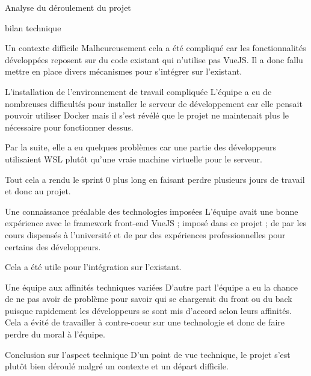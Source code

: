 \documentclass[]{article}
\begin{document}
{\begin{section}{Analyse du déroulement du projet}
\begin{subsection}{bilan technique}
\begin{subsubsection}{Un contexte difficile}
         Malheureusement cela a été compliqué car les fonctionnalités développées reposent sur du code existant qui n'utilise pas VueJS. Il a donc fallu mettre en place divers mécanismes pour s'intégrer sur l'existant.
     \end{subsubsection}

     \begin{subsubsection}{L'installation de l'environnement de travail compliquée}
         L'équipe a eu de nombreuses difficultés pour installer le serveur de développement car elle pensait pouvoir utiliser Docker mais il s'est révélé que le projet ne maintenait plus le nécessaire pour fonctionner dessus.

         Par la suite, elle a eu quelques problèmes car une partie des développeurs utilisaient WSL plutôt qu'une vraie machine virtuelle pour le serveur.

         Tout cela a rendu le sprint 0 plus long en faisant perdre plusieurs jours de travail et donc au projet.
     \end{subsubsection}

     \begin{subsubsection}{Une connaissance préalable des technologies imposées }
         L'équipe avait une bonne expérience avec le framework front-end VueJS ; imposé dans ce projet ; de par les cours dispensés à l'université et de par des expériences professionnelles pour certains des développeurs.

         Cela a été utile pour l'intégration sur l'existant.
     \end{subsubsection}

     \begin{subsubsection}{Une équipe aux affinités techniques variées }
         D'autre part l'équipe a eu la chance de ne pas avoir de problème pour savoir qui se chargerait du front ou du back puisque rapidement les développeurs se sont mis d'accord selon leurs affinités. Cela a évité de travailler à contre-coeur sur une technologie et donc de faire perdre du moral à l'équipe.
     \end{subsubsection}

     \begin{subsubsection}{Conclusion sur l'aspect technique}
        D'un point de vue technique, le projet s'est plutôt bien déroulé malgré un contexte et un départ difficile.
     \end{subsubsection}
 \end{subsection}

\newpage


\end{section}}
\end{document}
